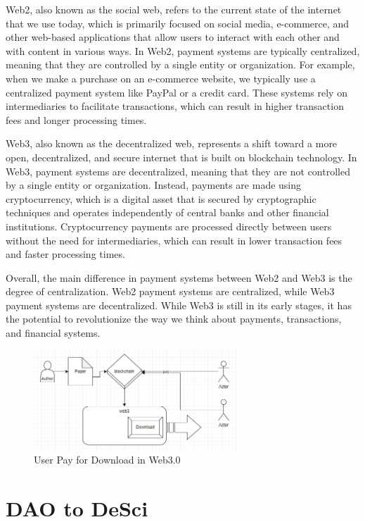 \documentclass[lettersize,journal]{IEEEtran}
\begin{document}
Web2, also known as the social web, refers to the current state of the internet that we use today, which is primarily focused on social media, e-commerce, and other web-based applications that allow users to interact with each other and with content in various ways. In Web2, payment systems are typically centralized, meaning that they are controlled by a single entity or organization. For example, when we make a purchase on an e-commerce website, we typically use a centralized payment system like PayPal or a credit card. These systems rely on intermediaries to facilitate transactions, which can result in higher transaction fees and longer processing times.

Web3, also known as the decentralized web, represents a shift toward a more open, decentralized, and secure internet that is built on blockchain technology. In Web3, payment systems are decentralized, meaning that they are not controlled by a single entity or organization. Instead, payments are made using cryptocurrency, which is a digital asset that is secured by cryptographic techniques and operates independently of central banks and other financial institutions. Cryptocurrency payments are processed directly between users without the need for intermediaries, which can result in lower transaction fees and faster processing times.

Overall, the main difference in payment systems between Web2 and Web3 is the degree of centralization. Web2 payment systems are centralized, while Web3 payment systems are decentralized. While Web3 is still in its early stages, it has the potential to revolutionize the way we think about payments, transactions, and financial systems.


\begin{figure}[h]
  \centering
  \includegraphics[width=3in]{assets/web3.png}
  \caption{User Pay for Download in Web3.0}
\end{figure}
  

\section{DAO to DeSci}
\end{document}
